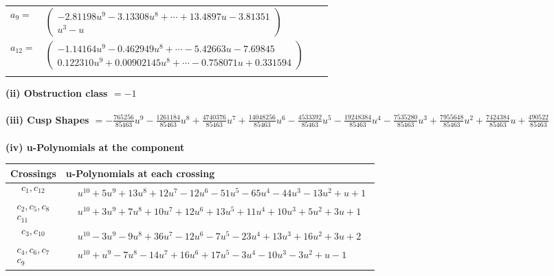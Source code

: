 \documentclass[1p]{elsarticle_modified}
\theoremstyle{definition}
\begin{document}
\begin{tabular}{m{7pt} m{180pt} m{7pt} m{180pt} }
\flushright $a_{9}=$&$\begin{pmatrix}-2.81198 u^{9}-3.13308 u^{8}+\cdots+13.4897 u-3.81351\\u^3- u\end{pmatrix}$ \\
\flushright $a_{12}=$&$\begin{pmatrix}-1.14164 u^{9}-0.462949 u^{8}+\cdots-5.42663 u-7.69845\\0.122310 u^{9}+0.00902145 u^{8}+\cdots-0.758071 u+0.331594\end{pmatrix}$\\&\end{tabular}
\flushleft \textbf{(ii) Obstruction class $= -1$}\\~\\
\flushleft \textbf{(iii) Cusp Shapes $= -\frac{765256}{85463} u^9-\frac{1261184}{85463} u^8+\frac{4740376}{85463} u^7+\frac{14048256}{85463} u^6-\frac{4533392}{85463} u^5-\frac{19248384}{85463} u^4-\frac{7535280}{85463} u^3+\frac{7955648}{85463} u^2+\frac{7424384}{85463} u+\frac{490522}{85463}$}\\~\\
\newpage\renewcommand{\arraystretch}{1}
\flushleft \textbf{(iv) u-Polynomials at the component}\newline \\
\begin{tabular}{m{50pt}|m{274pt}}
Crossings & \hspace{64pt}u-Polynomials at each crossing \\
\hline $$\begin{aligned}c_{1},c_{12}\end{aligned}$$&$\begin{aligned}
&u^{10}+5 u^9+13 u^8+12 u^7-12 u^6-51 u^5-65 u^4-44 u^3-13 u^2+u+1
\end{aligned}$\\
\hline $$\begin{aligned}c_{2},c_{5},c_{8}\\c_{11}\end{aligned}$$&$\begin{aligned}
&u^{10}+3 u^9+7 u^8+10 u^7+12 u^6+13 u^5+11 u^4+10 u^3+5 u^2+3 u+1
\end{aligned}$\\
\hline $$\begin{aligned}c_{3},c_{10}\end{aligned}$$&$\begin{aligned}
&u^{10}-3 u^9-9 u^8+36 u^7-12 u^6-7 u^5-23 u^4+13 u^3+16 u^2+3 u+2
\end{aligned}$\\
\hline $$\begin{aligned}c_{4},c_{6},c_{7}\\c_{9}\end{aligned}$$&$\begin{aligned}
&u^{10}+u^9-7 u^8-14 u^7+16 u^6+17 u^5-3 u^4-10 u^3-3 u^2+u-1
\end{aligned}$\\
\hline
\end{tabular}\\~\\
\end{document}
